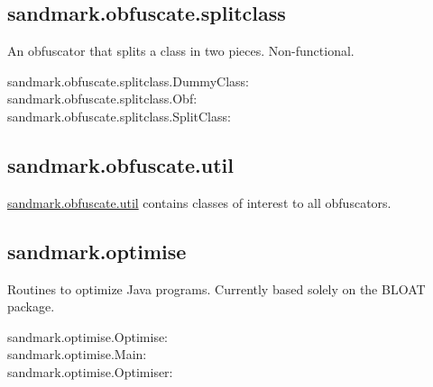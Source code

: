 \subsection{sandmark.obfuscate.splitclass}
An obfuscator that splits a class in two pieces.
Non-functional.
\begin{description}
   \item[sandmark.obfuscate.splitclass.DummyClass:]
   \item[sandmark.obfuscate.splitclass.Obf:]
   \item[sandmark.obfuscate.splitclass.SplitClass:]
\end{description}

\subsection{sandmark.obfuscate.util}
\url{sandmark.obfuscate.util} contains classes of
interest to all obfuscators.


\subsection{sandmark.optimise}
Routines to optimize Java programs. Currently based
solely on the BLOAT package.
\begin{description}
   \item[sandmark.optimise.Optimise:]
   \item[sandmark.optimise.Main:]
   \item[sandmark.optimise.Optimiser:]
\end{description}


